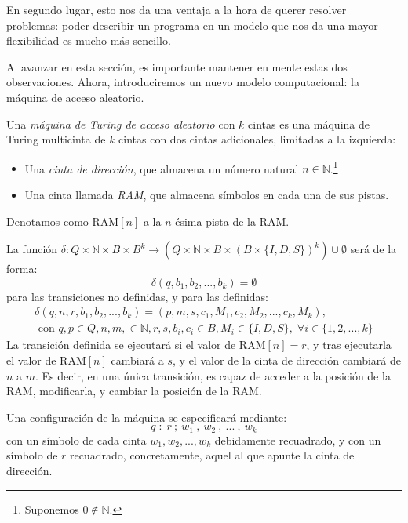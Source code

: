 En segundo lugar, esto nos da una ventaja a la hora de querer resolver problemas: poder describir un programa en un modelo que nos da una mayor flexibilidad es mucho más sencillo.

Al avanzar en esta sección, es importante mantener en mente estas dos observaciones. Ahora, introduciremos un nuevo modelo computacional: la máquina de acceso aleatorio. \cite{MacCormick2018}


\begin{definicion}
Una \emph{máquina de Turing de acceso aleatorio} con $k$ cintas es una máquina de Turing multicinta de $k$ cintas con dos cintas adicionales, limitadas a la izquierda:
\begin{itemize}
    \item Una \textit{cinta de dirección}, que almacena un número natural $n\in\mathbb{N}$.\footnote{Suponemos $0\notin\mathbb{N}$.}
    \item Una cinta llamada \textit{RAM}, que almacena símbolos en cada una de sus pistas.
\end{itemize}
Denotamos como $\text{RAM}[n]$ a la $n$-ésima pista de la RAM.

La función $\delta : Q \times \mathbb{N} \times B \times B^k \longrightarrow \left(Q \times \mathbb{N} \times B \times (B \times \{I, D, S\})^k\right) \cup \emptyset$ será de la forma:
$$
\delta(q, b_1, b_2, ..., b_k) = \emptyset
$$
para las transiciones no definidas, y para las definidas:
\begin{multline}
    \delta(q, n, r, b_1, b_2, ..., b_k) = (p, m, s, c_1, M_1, c_2, M_2, ..., c_k, M_k),\\ \text{ con }q,p\in Q, n, m, \in \mathbb{N}, r, s, b_i, c_i \in B, M_i \in \{I, D, S\},\;\forall i \in \{1, 2, ..., k\}
\end{multline}
La transición definida se ejecutará si el valor de $\text{RAM}[n]=r$, y tras ejecutarla el valor de $\text{RAM}[n]$ cambiará a $s$, y el valor de la cinta de dirección cambiará de $n$ a $m$. Es decir, en una única transición, es capaz de acceder a la posición de la RAM, modificarla, y cambiar la posición de la RAM.

Una configuración de la máquina se especificará mediante:
$$q\;:\;r\:;\:w_1\:,\:w_2\:,\:...\:,\:w_k$$
con un símbolo de cada cinta $w_1, w_2, ..., w_k$ debidamente recuadrado, y con un símbolo de $r$ recuadrado, concretamente, aquel al que apunte la cinta de dirección.
\end{definicion}

